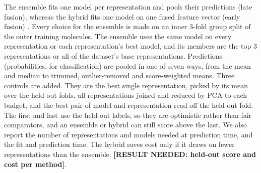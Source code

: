 
The ensemble fits one model per representation and pools their predictions (late fusion), whereas the hybrid fits one model on one fused feature vector (early fusion) \citep{Stahlschmidt2022}. Every choice for the ensemble is made on an inner 3-fold group split of the outer training molecules. The ensemble uses the same model on every representation or each representation's best model, and its members are the top 3 representations or all of the dataset's base representations. Predictions (probabilities, for classification) are pooled in one of seven ways, from the mean and median to trimmed, outlier-removed and score-weighted means. Three controls are added. %
They are the best single representation, picked by its mean over the held-out folds, all representations joined and reduced by PCA to each budget, and the best pair of model and representation read off the held-out fold. The first and last use the held-out labels, so they are optimistic rather than fair comparators, and an ensemble or hybrid can still score above the last. We also report the number of representations and models needed at prediction time, and the fit and prediction time. The hybrid saves cost only if it draws on fewer representations than the ensemble. \textbf{[RESULT NEEDED: held-out score and cost per method]}.

